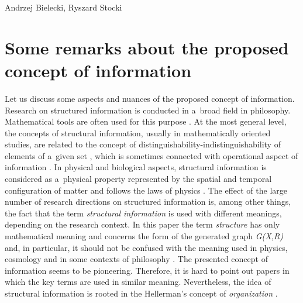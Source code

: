 \begin{artengenv2auth}{Andrzej Bielecki, Ryszard Stocki}
\section{Some remarks about the proposed concept of information}

Let us discuss some aspects and nuances of the proposed concept of information. Research on structured information is conducted in a~broad field in philosophy. Mathematical tools are often used for this purpose 
\parencite[][]{schroeder_analogy_2019}. %
 At the most general level, the concepts of structural information, usually in mathematically oriented studies, are related to the concept of distinguishability-indistinguishability of elements of a~given set 
\parencite[][]{dodig-crnkovic_theoretical_2019}, %
 which is sometimes connected with operational aspect of information 
\parencite[][]{bateson_information_1951}. %
 In physical and biological aspects, structural information is considered as a~physical property represented by the spatial and temporal configuration of matter and follows the laws of physics 
\parencites[][]{ebeling_selforganization_2015}[][]{davies_demon_2019}. %
 The effect of the large number of research directions on structured information is, among other things, the fact that the term \textit{structural information} is used with different meanings, depending on the research context. In this paper the term \textit{structure} has only mathematical meaning and concerns the form of the generated graph \textit{G(X,R)} and, in particular, it should not be confused with the meaning used in physics, cosmology and in some contexts of philosophy 
\parencite[see.g][]{burgin_information_2011}. %
 The presented concept of information seems to be pioneering. Therefore, it is hard to point out papers in which the key terms are used in similar meaning. Nevertheless, the idea of structural information is rooted in the Hellerman's concept of \textit{organization}  
\parencites[see][]{hellerman_representation_2006}[][]{hellerman_animate_2016}.%





\end{artengenv2auth}
